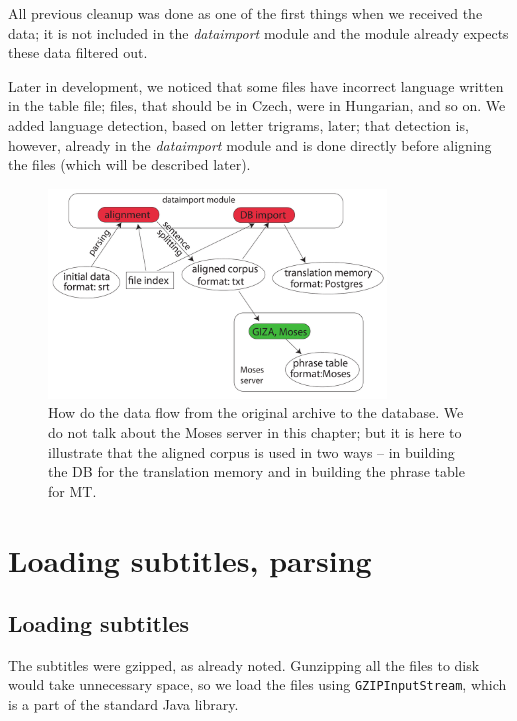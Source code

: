 All previous cleanup was done as one of the first things when we received the data; it is not included in the \emph{dataimport} module and the module already expects these data filtered out.

Later in development, we noticed that some files have incorrect language written in the table file; files, that should be in Czech, were in  Hungarian, and so on. We added language detection, based on letter trigrams, later; that detection is, however, already in the \emph{dataimport} module and is done directly before aligning the files (which will be described later).


\begin{figure}[t]
\begin{center}
\includegraphics[width=0.8\textwidth]{figures/data_flow.pdf}
\end{center}
\caption{How do the data flow from the original archive to the database. We do not talk about the Moses server in this chapter; but it is here to illustrate that the aligned corpus is used in two ways -- in building the DB for the translation memory and in building the phrase table for MT.}\label{dataflow}
\end{figure}

\section{Loading subtitles, parsing}
\label{parsing_subs}
\subsection*{Loading subtitles}
The subtitles were gzipped, as already noted. Gunzipping all the files to disk would take unnecessary space, so we load the files using \texttt{GZIPInputStream}, which is a part of the standard Java library.

